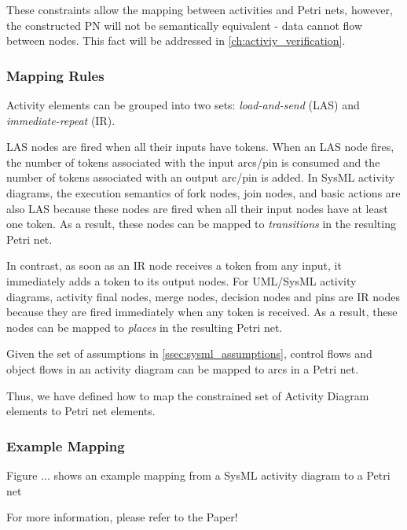 These constraints allow the mapping between activities and Petri nets, however, the constructed PN will not be semantically equivalent - data cannot flow between nodes. This fact will be addressed in \autoref{ch:activiy_verification}.

\subsubsection{Mapping Rules}

Activity elements can be grouped into two sets: \emph{load-and-send} (LAS) and \emph{immediate-repeat} (IR).

LAS nodes are fired when all their inputs have tokens. When an LAS node fires, the number of tokens associated with the input arcs/pin is consumed and the number of tokens associated with an output arc/pin is added. In SysML activity diagrams, the execution semantics of fork nodes, join nodes, and basic actions are also LAS because these nodes are fired when all their input nodes have at least one token. As a result, these nodes can be mapped to \emph{transitions} in the resulting Petri net.

In contrast, as soon as an IR node receives a token from any input, it immediately adds a token to its output nodes. For UML/SysML activity diagrams, activity final nodes, merge nodes, decision nodes and pins are IR nodes because they are fired immediately when any token is received. As a result, these nodes can be mapped to \emph{places} in the resulting Petri net.

Given the set of assumptions in \autoref{ssec:sysml_assumptions}, control flows and object flows in an activity diagram can be mapped to arcs in a Petri net.

Thus, we have defined how to map the constrained set of Activity Diagram elements to Petri net elements.

\subsubsection{Example Mapping}

Figure ... shows an example mapping from a SysML activity diagram to a Petri net

For more information, please refer to the Paper!